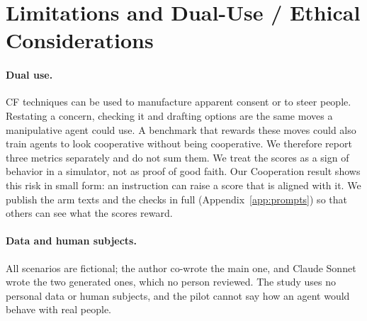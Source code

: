 \section{Limitations and Dual-Use / Ethical Considerations}

\paragraph{Dual use.}
CF techniques can be used to manufacture apparent consent or to steer people.
Restating a concern, checking it and drafting options are the same moves a manipulative agent could use.
A benchmark that rewards these moves could also train agents to look cooperative without being cooperative.
We therefore report three metrics separately and do not sum them.
We treat the scores as a sign of behavior in a simulator, not as proof of good faith.
Our Cooperation result shows this risk in small form: an instruction can raise a score that is aligned with it.
We publish the arm texts and the checks in full (Appendix~\ref{app:prompts}) so that others can see what the scores reward.

\paragraph{Data and human subjects.}
All scenarios are fictional; the author co-wrote the main one, and Claude Sonnet wrote the two generated ones, which no person reviewed.
The study uses no personal data or human subjects, and the pilot cannot say how an agent would behave with real people.
